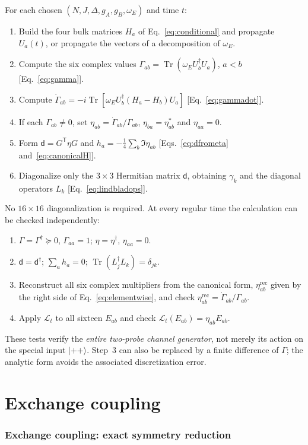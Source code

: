 \documentclass[11pt,a4paper]{article}
\newcommand{\ket}[1]{\lvert #1\rangle}
\newcommand{\Tr}{\operatorname{Tr}}
\newcommand{\dmat}{\mathsf d}
\begin{document}
For each chosen $(N,J,\Delta,g_A,g_B,\omega_E)$ and time $t$:
\begin{enumerate}
\item Build the four bulk matrices $H_a$ of Eq.~\eqref{eq:conditional}
and propagate $U_a(t)$, or propagate the vectors of a decomposition of
$\omega_E$.
\item Compute the six complex values
$\Gamma_{ab}=\Tr(\omega_EU_b^\dagger U_a)$, $a<b$
[Eq.~\eqref{eq:gamma}].
\item Compute $\dot\Gamma_{ab}=-i\Tr[\omega_EU_b^\dagger(H_a-H_b)U_a]$
[Eq.~\eqref{eq:gammadot}].
\item If each $\Gamma_{ab}\ne0$, set $\eta_{ab}=\dot\Gamma_{ab}/\Gamma_{ab}$,
$\eta_{ba}=\eta_{ab}^*$ and $\eta_{aa}=0$.
\item Form $\dmat=G^{\mathsf T}\eta G$ and $h_a=-\frac14\sum_b\Im\eta_{ab}$
[Eqs.~\eqref{eq:dfrometa} and~\eqref{eq:canonicalH}].
\item Diagonalize only the $3\times3$ Hermitian matrix $\dmat$, obtaining
$\gamma_k$ and the diagonal operators $L_k$ [Eq.~\eqref{eq:lindbladops}].
\end{enumerate}
No $16\times16$ diagonalization is required. At every regular time the
calculation can be checked independently:
\begin{enumerate}
\item $\Gamma=\Gamma^\dagger\succeq0$, $\Gamma_{aa}=1$;
$\eta=\eta^\dagger$, $\eta_{aa}=0$.
\item $\dmat=\dmat^\dagger$; $\sum_ah_a=0$;
$\Tr(L_j^\dagger L_k)=\delta_{jk}$.
\item Reconstruct all six complex multipliers from the canonical form,
$\eta^{\mathrm{rec}}_{ab}$ given by the right side of
Eq.~\eqref{eq:elementwise}, and check
$\eta^{\mathrm{rec}}_{ab}=\dot\Gamma_{ab}/\Gamma_{ab}$.
\item Apply $\mathcal L_t$ to all sixteen $E_{ab}$ and check
$\mathcal L_t(E_{ab})=\eta_{ab}E_{ab}$.
\end{enumerate}
These tests verify the \emph{entire two-probe channel generator}, not
merely its action on the special input $\ket{++}$. Step~3 can also be
replaced by a finite difference of $\Gamma$; the analytic form avoids
the associated discretization error.

\part{Exchange coupling}
\label{part:exchange}

\section{Exchange coupling: exact symmetry reduction}
\label{sec:ex}
\end{document}
